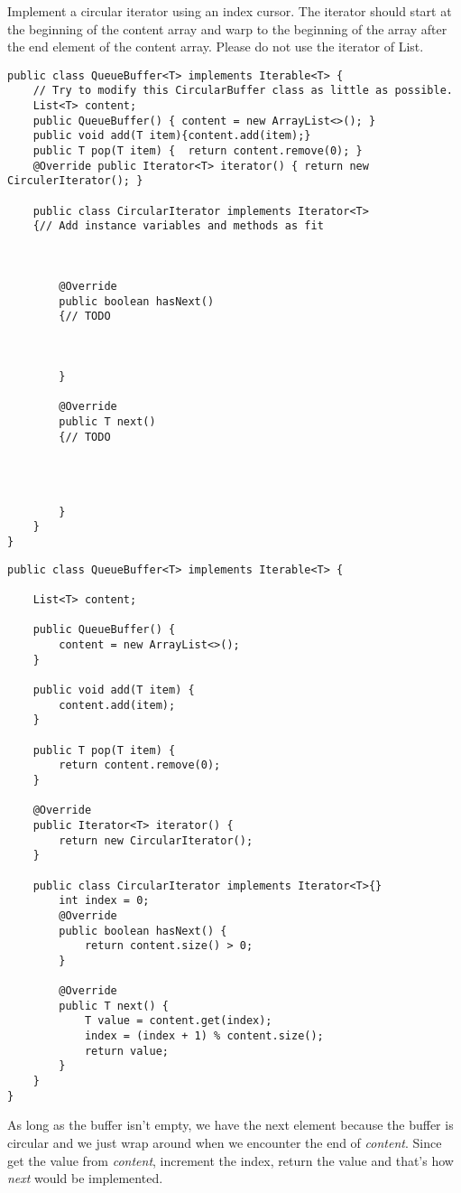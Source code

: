 \question Implement a circular iterator using an index cursor. The iterator should start at the beginning of the content array and warp to the beginning of the array after the end element of the content array. Please do not use the iterator of List.

\begin{lstlisting}
public class QueueBuffer<T> implements Iterable<T> {
    // Try to modify this CircularBuffer class as little as possible.
    List<T> content;
    public QueueBuffer() { content = new ArrayList<>(); }
    public void add(T item){content.add(item);}
    public T pop(T item) {  return content.remove(0); }
    @Override public Iterator<T> iterator() { return new CirculerIterator(); }

    public class CircularIterator implements Iterator<T>
    {// Add instance variables and methods as fit
    
    
    
        @Override
        public boolean hasNext()
        {// TODO
            
            
            
        }

        @Override
        public T next() 
        {// TODO
            
            
            
            
        }
    }
}
\end{lstlisting}
\begin{solution}
\begin{lstlisting}
public class QueueBuffer<T> implements Iterable<T> {

    List<T> content;

    public QueueBuffer() {
        content = new ArrayList<>();
    }

    public void add(T item) {
        content.add(item);
    }

    public T pop(T item) {
        return content.remove(0);
    }

    @Override
    public Iterator<T> iterator() {
        return new CircularIterator();
    }

    public class CircularIterator implements Iterator<T>{}
        int index = 0;
        @Override
        public boolean hasNext() {
            return content.size() > 0;
        }

        @Override
        public T next() {
            T value = content.get(index);
            index = (index + 1) % content.size();
            return value;
        }
    }
}
\end{lstlisting}
\end{solution}
\begin{meta}
As long as the buffer isn't empty, we have the next element because the buffer is circular and we just wrap around when we encounter the end of \emph{content}. Since get the value from \emph{content}, increment the index, return the value and that's how \emph{next} would be implemented.
\end{meta}
\newpage

